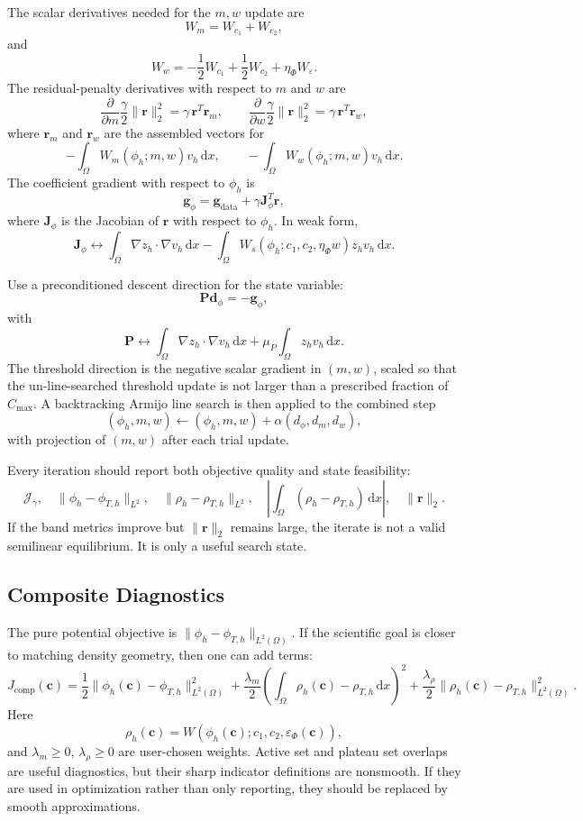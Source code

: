\documentclass[11pt]{article}
\newcommand{\dd}{\,\mathrm d}
\newcommand{\OmegaD}{\Omega}
\newcommand{\W}{W}
\newcommand{\cvec}{\bm c}
\newcommand{\epsp}{\varepsilon_\Phi}
\begin{document}
The scalar derivatives needed for the \(m,w\) update are
\[
  \W_m
  =
  \W_{c_1}+\W_{c_2},
\]
and
\[
  \W_w
  =
  -\frac{1}{2}\W_{c_1}
  +
  \frac{1}{2}\W_{c_2}
  +
  \eta_\Phi\W_\varepsilon.
\]
The residual-penalty derivatives with respect to \(m\) and \(w\) are
\[
  \frac{\partial}{\partial m}
  \frac{\gamma}{2}\|\bm r\|_2^2
  =
  \gamma\,\bm r^T\bm r_m,
  \qquad
  \frac{\partial}{\partial w}
  \frac{\gamma}{2}\|\bm r\|_2^2
  =
  \gamma\,\bm r^T\bm r_w,
\]
where \(\bm r_m\) and \(\bm r_w\) are the assembled vectors for
\[
  -\int_{\OmegaD}\W_m(\phi_h;m,w)v_h\dd x,
  \qquad
  -\int_{\OmegaD}\W_w(\phi_h;m,w)v_h\dd x.
\]
The coefficient gradient with respect to \(\phi_h\) is
\[
  \bm g_\phi
  =
  \bm g_{\mathrm{data}}
  +
  \gamma \bm J_\phi^T\bm r,
\]
where \(\bm J_\phi\) is the Jacobian of \(\bm r\) with respect to
\(\phi_h\).  In weak form,
\[
  \bm J_\phi
  \leftrightarrow
  \int_{\OmegaD}\nabla z_h\cdot\nabla v_h\dd x
  -
  \int_{\OmegaD}\W_s(\phi_h;c_1,c_2,\eta_\Phi w)z_hv_h\dd x.
\]

Use a preconditioned descent direction for the state variable:
\[
  \bm P\bm d_\phi=-\bm g_\phi,
\]
with
\[
  \bm P
  \leftrightarrow
  \int_{\OmegaD}\nabla z_h\cdot\nabla v_h\dd x
  +
  \mu_P\int_{\OmegaD}z_hv_h\dd x.
\]
The threshold direction is the negative scalar gradient in \((m,w)\), scaled
so that the un-line-searched threshold update is not larger than a prescribed
fraction of \(C_{\max}\).  A backtracking Armijo line search is then applied
to the combined step
\[
  (\phi_h,m,w)
  \leftarrow
  (\phi_h,m,w)
  +
  \alpha(d_\phi,d_m,d_w),
\]
with projection of \((m,w)\) after each trial update.

Every iteration should report both objective quality and state feasibility:
\[
  \mathcal J_\gamma,\quad
  \|\phi_h-\phi_{T,h}\|_{L^2},\quad
  \|\rho_h-\rho_{T,h}\|_{L^2},\quad
  \left|\int_{\OmegaD}(\rho_h-\rho_{T,h})\dd x\right|,
  \quad
  \|\bm r\|_2.
\]
If the band metrics improve but \(\|\bm r\|_2\) remains large, the iterate is
not a valid semilinear equilibrium.  It is only a useful search state.

\subsection{Composite Diagnostics}

The pure potential objective is
\(\|\phi_h-\phi_{T,h}\|_{L^2(\OmegaD)}\).  If the scientific goal is closer to
matching density geometry, then one can add terms:
\[
  J_{\mathrm{comp}}(\cvec)
  =
  \frac{1}{2}\|\phi_h(\cvec)-\phi_{T,h}\|_{L^2(\OmegaD)}^2
  +
  \frac{\lambda_m}{2}
  \left(\int_{\OmegaD}\rho_h(\cvec)-\rho_{T,h}\dd x\right)^2
  +
  \frac{\lambda_\rho}{2}
  \|\rho_h(\cvec)-\rho_{T,h}\|_{L^2(\OmegaD)}^2.
\]
Here
\[
  \rho_h(\cvec)
  =
  \W(\phi_h(\cvec);c_1,c_2,\epsp(\cvec)),
\]
and \(\lambda_m\ge 0\), \(\lambda_\rho\ge 0\) are user-chosen weights.  Active
set and plateau set overlaps are useful diagnostics, but their sharp
indicator definitions are nonsmooth.  If they are used in optimization rather
than only reporting, they should be replaced by smooth approximations.
\end{document}
